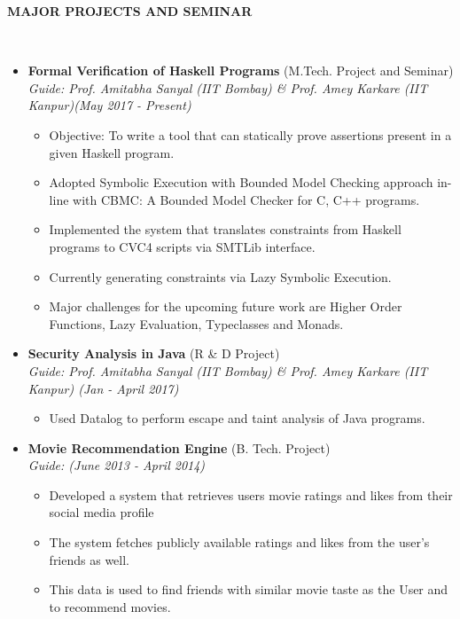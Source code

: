 \documentclass[a4paper,10pt]{article}
\newcommand{\isep}{-2 pt}
\newcommand{\lsep}{-0.5cm}
\newcommand{\resheading}[1]{{\small \colorbox{mygrey}{\begin{minipage}{0.975\textwidth}{\textbf{#1 \vphantom{p\^{E}}}}\end{minipage}}}}
\begin{document}
\resheading{\textbf{MAJOR PROJECTS AND SEMINAR} }\\[\lsep]
\begin{itemize}
\itemsep \isep
 
\item \textbf{Formal Verification of Haskell Programs} (M.Tech. Project and Seminar) \\
 \emph{Guide: Prof. Amitabha Sanyal (IIT Bombay) \& Prof. Amey Karkare  (IIT Kanpur)\hfill (May 2017 - Present)} \\[-0.6cm]
	\begin{itemize}\itemsep \isep
	\item Objective: To write a tool that can statically prove assertions present in a given Haskell program.
	\item Adopted Symbolic Execution with Bounded Model Checking approach in-line with CBMC: A Bounded Model Checker for C, C++ programs.
	\item Implemented the system that translates constraints from Haskell programs to CVC4 scripts via SMTLib interface.
	\item Currently generating constraints via Lazy Symbolic Execution.
	\item Major challenges for the upcoming future work are Higher Order Functions, Lazy Evaluation, Typeclasses and Monads.
	\end{itemize}

\item \textbf{Security Analysis in Java} (R & D Project) \\
 \emph{Guide: Prof. Amitabha Sanyal (IIT Bombay) \& Prof. Amey Karkare  (IIT Kanpur) \hfill (Jan - April 2017)} \\[-0.6cm]
	\begin{itemize}\itemsep \isep
	\item Used Datalog to perform escape and taint analysis of Java programs.
	\end{itemize}

\item \textbf{Movie Recommendation Engine
} (B. Tech. Project) \\
 \emph{Guide: \hfill (June 2013 - April 2014)} \\[-0.6cm]
 	\begin{itemize}\itemsep \isep
	\item Developed a system that retrieves users movie ratings and likes from their social media profile
	\item The system fetches publicly available ratings and likes from the user's friends as well.
  	\item This data is used to find friends with similar movie taste as the User and to recommend movies.
	\end{itemize}

\end{itemize}
\end{document}

